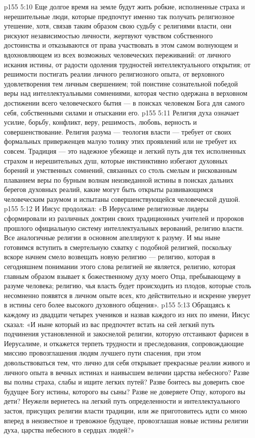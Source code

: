 \vs p155 5:10 Еще долгое время на земле будут жить робкие, исполненные страха и нерешительные люди, которые предпочтут именно так получать религиозное утешение, хотя, связав таким образом свою судьбу с религиями власти, они рискуют независимостью личности, жертвуют чувством собственного достоинства и отказываются от права участвовать в этом самом волнующем и вдохновляющем из всех возможных человеческих переживаний: от личного искания истины, от радости одоления трудностей интеллектуального открытия; от решимости постигать реалии личного религиозного опыта, от верховного удовлетворения тем личным свершением; той поистине сознательной победой веры над интеллектуальными сомнениями, которая честно одержана в верховном достижении всего человеческого бытия --- в поисках человеком Бога для самого себя, собственными силами и отыскании его.
\vs p155 5:11 Религия духа означает усилие, борьбу, конфликт, веру, решимость, любовь, верность и совершенствование. Религия разума --- теология власти --- требует от своих формальных приверженцев малую толику этих проявлений или не требует их совсем. Традиция --- это надежное убежище и легкий путь для тех исполненных страхом и нерешительных душ, которые инстинктивно избегают духовных борений и умственных сомнений, связанных со столь смелым и рискованным плаванием веры по бурным волнам неизведанной истины в поисках дальних берегов духовных реалий, какие могут быть открыты развивающимся человеческим разумом и испытаны совершенствующейся человеческой душой.
\vs p155 5:12 \pc И Иисус продолжал: «В Иерусалиме религиозные лидеры сформировали из различных доктрин своих традиционных учителей и пророков прошлого официальную систему интеллектуальных верований, религию власти. Все аналогичные религии в основном апеллируют к разуму. И мы ныне готовимся вступить в смертельную схватку с подобной религией, поскольку вскоре начнем смело возвещать новую религию --- религию, которая в сегодняшнем понимании этого слова религией не является, религию, которая главным образом взывает к божественному духу моего Отца, пребывающему в разуме человека; религию, чья власть будет происходить из плодов, которые столь несомненно появятся в личном опыте всех, кто действительно и искренне уверует в истины сего более высокого духовного общения».
\vs p155 5:13 Обращаясь к каждому из двадцати четырех учеников и назвав каждого из них по имени, Иисус сказал: «И ныне который из вас предпочтет встать на сей легкий путь подчинения установленной и закоснелой религии, которую отстаивают фарисеи в Иерусалиме, и откажется терпеть трудности и преследования, сопровождающие миссию провозглашения людям лучшего пути спасения, при этом довольствоваться тем, что лично для себя открывает прекрасные реалии живого и личного опыта в вечных истинах и наивысшем величии царства небесного? Разве вы полны страха, слабы и ищите легких путей? Разве боитесь вы доверить свое будущее Богу истины, которого вы сыны? Разве не доверяете Отцу, которого вы дети? Неужели вернетесь на легкий путь определенности и интеллектуального застоя, присущих религии власти традиции, или же приготовитесь идти со мною вперед в неизвестное и тревожное будущее, провозглашая новые истины религии духа, царства небесного в сердцах людей?»
